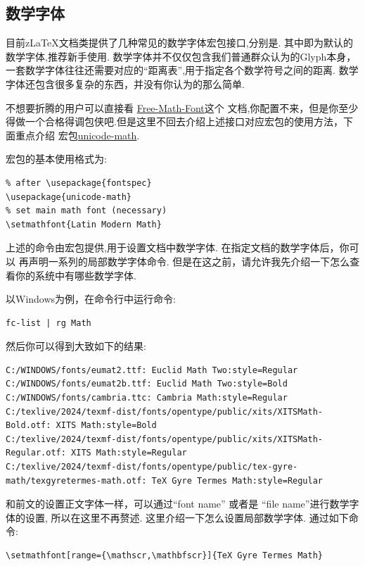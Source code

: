 \subsection{数学字体}
目前z\LaTeX{}文档类提供了几种常见的数学字体宏包接口,分别是. 
其中即为默认的数学字体,推荐新手使用. 数学字体并不仅仅包含我们普通群众认为的Glyph本身，
一套数学字体往往还需要对应的``距离表'',用于指定各个数学符号之间的距离. 数学字体还包含很多复杂的东西，并没有你认为的那么简单.

不想要折腾的用户可以直接看 \href{http://mirrors.ctan.org/info/Free_Math_Font_Survey/en/survey.pdf}{Free-Math-Font}这个 
文档,你配置不来，但是你至少得做一个合格得调包侠吧.但是这里不回去介绍上述接口对应宏包的使用方法，下面重点介绍
宏包\href{http://mirrors.ctan.org/macros/unicodetex/latex/unicode-math/unicode-math.pdf}{unicode-math}. 

宏包的基本使用格式为:
\begin{verbatim}
% after \usepackage{fontspec}
\usepackage{unicode-math}
% set main math font (necessary)
\setmathfont{Latin Modern Math}
\end{verbatim}

上述的命令\cmd{\setmathfont}\index{\cmd{\setmathfont}}由宏包提供,用于设置文档中数学字体. 在指定文档的数学字体后，你可以
再声明一系列的局部数学字体命令. 但是在这之前，请允许我先介绍一下怎么查看你的系统中有哪些数学字体. 

以Windows为例，在命令行中运行命令:
\begin{verbatim}
fc-list | rg Math
\end{verbatim}

然后你可以得到大致如下的结果:
\begin{verbatim}
C:/WINDOWS/fonts/eumat2.ttf: Euclid Math Two:style=Regular
C:/WINDOWS/fonts/eumat2b.ttf: Euclid Math Two:style=Bold
C:/WINDOWS/fonts/cambria.ttc: Cambria Math:style=Regular
C:/texlive/2024/texmf-dist/fonts/opentype/public/xits/XITSMath-Bold.otf: XITS Math:style=Bold
C:/texlive/2024/texmf-dist/fonts/opentype/public/xits/XITSMath-Regular.otf: XITS Math:style=Regular
C:/texlive/2024/texmf-dist/fonts/opentype/public/tex-gyre-math/texgyretermes-math.otf: TeX Gyre Termes Math:style=Regular
\end{verbatim}

和前文的设置正文字体一样，可以通过``font name'' 或者是 ``file name''进行数学字体的设置, 所以在这里不再赘述. 
这里介绍一下怎么设置局部数学字体. 通过如下命令:
\begin{verbatim}
\setmathfont[range={\mathscr,\mathbfscr}]{TeX Gyre Termes Math}
\end{verbatim}

